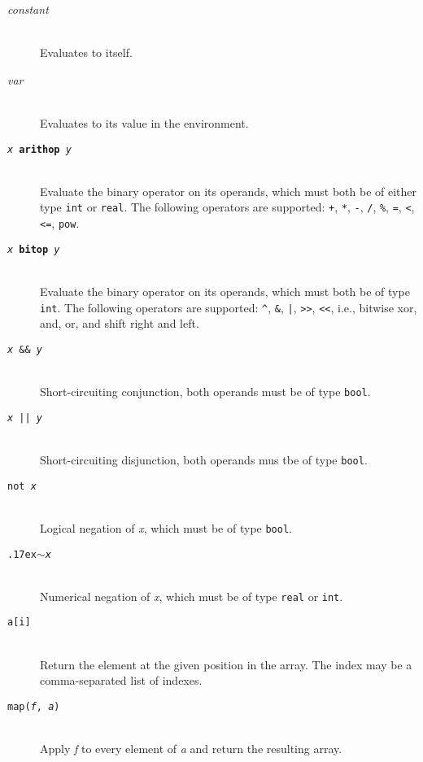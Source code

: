 \documentclass[oneside]{memoir}
\newcommand\boolt[0]{\texttt{bool}}
\newcommand\realt[0]{\texttt{real}}
\newcommand\intt[0]{\texttt{int}}
\renewcommand\tilde[0]{{\raise.17ex\hbox{$\scriptstyle\sim$}}}
\begin{document}
\begin{description}
  \item[\textit{constant}]\hfill\\
    Evaluates to itself.

  \item[\textit{var}]\hfill\\
    Evaluates to its value in the environment.

  \item[\texttt{\textit{x} \textbf{arithop} \textit{y}}] \hfill\\
    Evaluate the binary operator on its operands, which must both be
    of either type \intt{} or \realt.  The following operators are
    supported: \texttt{+}, \texttt{*}, \texttt{-}, \texttt{/},
    \texttt{\%}, \texttt{=}, \texttt{<}, \texttt{<=}, \texttt{pow}.

  \item[\texttt{\textit{x} \textbf{bitop} \textit{y}}] \hfill\\
    Evaluate the binary operator on its operands, which must both be
    of type \intt.  The following operators are supported:
    \texttt{\^}, \texttt{\&}, \texttt{|}, \texttt{>>}, \texttt{<<},
        i.e., bitwise xor, and, or, and shift right and left.  

  \item[\texttt{\textit{x} \&\& \textit{y}}]\hfill\\
    Short-circuiting conjunction, both operands must be of type \boolt.

  \item[\texttt{\textit{x} || \textit{y}}]\hfill\\
    Short-circuiting disjunction, both operands mus tbe of type \boolt.

  \item[\texttt{not \textit{x}}]\hfill\\
    Logical negation of \textit{x}, which must be of type \boolt.

  \item[\texttt{\tilde \textit{x}}]\hfill\\
    Numerical negation of \textit{x}, which must be of type \realt{} or \intt.

  \item[\texttt{a[i]}]\hfill\\
    Return the element at the given position in the array.  The index
    may be a comma-separated list of indexes.

  \item[\texttt{map(\textit{f}, \textit{a})}]\hfill\\
    Apply \textit{f} to every element of \textit{a} and return the resulting array.


\end{description}
\end{document}
